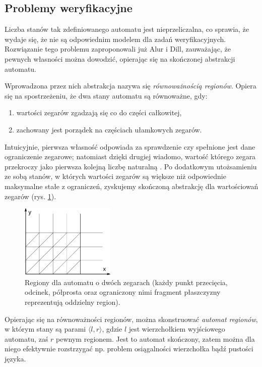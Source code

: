 \documentclass{pracamgr}
\newcommand{\pair}[2]{\langle #1, #2 \rangle}
\theoremstyle{plain}
\begin{document}
\subsection{Problemy weryfikacyjne}

Liczba stanów tak zdefiniowanego automatu jest nieprzeliczalna, co
sprawia, że wydaje się, że nie są odpowiednim modelem dla zadań
weryfikacyjnych. Rozwiązanie tego problemu zaproponowali już Alur i
Dill\cite{alur-dill}, zauważając, że pewnych własności można dowodzić,
opierając się na skończonej abstrakcji automatu.

Wprowadzona przez nich abstrakcja nazywa się \emph{równoważnością
  regionów}. Opiera się na spostrzeżeniu, że dwa stany automatu są
równoważne, gdy:
\begin{samepage}
\begin{enumerate}
  \item wartości zegarów zgadzają się co do części całkowitej,
  \item zachowany jest porządek na częściach ułamkowych zegarów.
\end{enumerate}
\end{samepage}
Intuicyjnie, pierwsza własność odpowiada za sprawdzenie czy spełnione
jest dane ograniczenie zegarowe; natomiast dzięki drugiej wiadomo,
wartość którego zegara przekroczy jako pierwsza kolejną liczbę
naturalną \cite{am:decision}. Po dodatkowym utożsamieniu ze sobą stanów, w
których wartości zegarów są większe niż odpowiednie maksymalne stałe z
ograniczeń, zyskujemy skończoną abstrakcję dla wartościowań zegarów
(rys. \ref{img:regions}).
\begin{figure}[ht]
  \centering
  \includegraphics[width=0.4\textwidth]{img/ta-regions}
  \caption{Regiony dla automatu o dwóch zegarach (każdy punkt
    przecięcia, odcinek, półprosta oraz ograniczony nimi fragment
    płaszczyzny reprezentują oddzielny region).}
  \label{img:regions}
\end{figure}

Opierając się na równoważności regionów, można skonstruować
\emph{automat regionów}, w którym stany są parami $\pair{l}{r}$, gdzie
$l$ jest wierzchołkiem wyjściowego automatu, zaś $r$ pewnym
regionem. Jest to automat skończony, zatem można dla niego efektywnie
rozstrzygać np. problem osiągalności wierzchołka bądź pustości języka.
\end{document}
